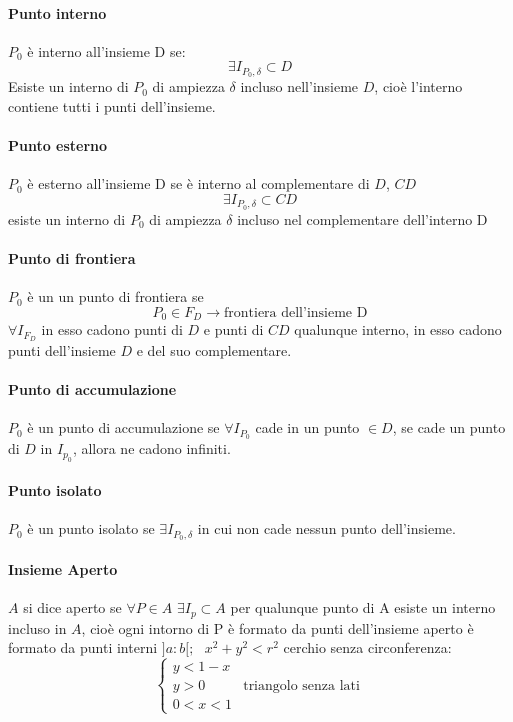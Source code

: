 \paragraph{Punto interno} $P_0$ è interno all'insieme D se:
\begin{equation}
    \exists I_{P_0,\delta} \subset D
\end{equation}
Esiste un interno di $P_0$ di ampiezza $\delta$ incluso nell'insieme $D$, cioè l'interno contiene tutti i
punti dell'insieme.
\paragraph{Punto esterno} $P_0$ è esterno all'insieme D se è interno al complementare di $D$, $CD$
\begin{equation}
    \exists I_{P_0,\delta}\subset CD
\end{equation}
esiste un interno di $P_0$ di ampiezza $\delta$ incluso nel complementare dell'interno D
\paragraph{Punto di frontiera} $P_0$ è un un punto di frontiera se
\begin{equation}
    P_0\in F_D \to \text{frontiera dell'insieme D}
\end{equation}
$\forall I_{F_D}$ in esso cadono punti di $D$ e punti di $CD$ qualunque interno, in esso cadono punti
dell'insieme $D$ e del suo complementare.
\paragraph{Punto di accumulazione}
$P_0$ è un punto di accumulazione se $\forall I_{P_0}$ cade in un punto $\in D$, se cade un punto di $D$
in $I_{p_0}$, allora ne cadono infiniti.
\paragraph{Punto isolato}
$P_0$ è un punto isolato se $\exists I_{P_0,\delta}$ in cui non cade nessun punto dell'insieme.
\paragraph{Insieme Aperto}
\begin{defi}
    $A$ si dice aperto se $\forall P \in A$ $\exists I_p \subset A$ per qualunque punto di A esiste un interno
    incluso in $A$, cioè ogni intorno di P è formato da punti dell'insieme aperto è formato da punti interni
    $]a:b[;\text{ } x^2+y^2<r^2$ cerchio senza circonferenza:
    \begin{equation}
        \begin{cases}
            y<1-x\\
            y>0 & \text{triangolo senza lati}\\
            0<x<1
        \end{cases}
    \end{equation}
\end{defi}
